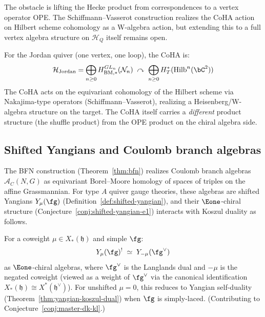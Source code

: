 \begin{remark}[Scope]
The obstacle is lifting the Hecke product from correspondences to a vertex operator OPE.  The Schiffmann--Vasserot construction \cite{SV13} realizes the CoHA action on Hilbert scheme cohomology as a W-algebra action, but extending this to a full vertex algebra structure on $\mathcal{H}_Q$ itself remains open.
\end{remark}

\begin{example}\label{ex:jordan-coha}
For the Jordan quiver (one vertex, one loop), the CoHA is:
\[
\mathcal{H}_{\text{Jordan}} = \bigoplus_{n \geq 0} H^{GL_n}_{\mathrm{BM},*}(\mathcal{N}_n) \;\curvearrowright\; \bigoplus_{n \geq 0} H^*_T(\mathrm{Hilb}^n(\bC^2))
\]
The CoHA acts on the equivariant cohomology of the Hilbert scheme via Nakajima-type operators (Schiffmann--Vasserot), realizing a Heisenberg/W-algebra structure on the target.  The CoHA itself carries a \emph{different} product structure (the shuffle product) from the OPE product on the chiral algebra side.
\end{example}


\subsection{Shifted Yangians and Coulomb branch algebras}
\label{sec:shifted-coulomb}

The BFN construction (Theorem~\ref{thm:bfn}) realizes Coulomb branch
algebras $\mathcal{A}_C(N,G)$ as equivariant Borel--Moore homology of
spaces of triples on the affine Grassmannian.  For type $A$ quiver gauge
theories, these algebras are shifted Yangians
$Y_\mu(\fg)$ (Definition~\ref{def:shifted-yangian}), and their
$\Eone$-chiral structure (Conjecture~\ref{conj:shifted-yangian-e1})
interacts with Koszul duality as follows.

\begin{conjecture}
\label{conj:shifted-yangian-langlands}
For a coweight $\mu \in X_*(\mathfrak{h})$ and simple $\fg$:
\begin{equation}\label{eq:shifted-langlands-dual}
Y_\mu(\fg)^! \;\simeq\; Y_{-\mu}(\fg^\vee)
\end{equation}
as $\Eone$-chiral algebras, where $\fg^\vee$ is the Langlands dual and
$-\mu$ is the negated coweight (viewed as a weight of $\fg^\vee$ via
the canonical identification $X_*(\mathfrak{h}) \cong X^*(\mathfrak{h}^\vee)$).
For unshifted $\mu = 0$, this reduces to Yangian self-duality
(Theorem~\ref{thm:yangian-koszul-dual}) when $\fg$ is simply-laced.
(Contributing to Conjecture~\ref{conj:master-dk-kl}.)
\end{conjecture}

